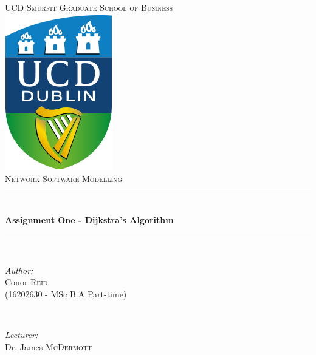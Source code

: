 \documentclass[paper=a4, fontsize=11pt]{scrartcl} %
\begin{document}
\begin{titlepage}

\newcommand{\HRule}{\rule{\linewidth}{0.5mm}} %

\center %


\textsc{\LARGE UCD Smurfit Graduate School of Business}\\[1.5cm] %
\includegraphics[scale = 0.6]{images/logo.png} \\ [1cm]
\textsc{\Large Network Software Modelling}\\[0.5cm] %


\HRule \\[0.4cm]
{ \LARGE \bfseries Assignment One - Dijkstra's Algorithm}\\[0.4cm] %
\HRule \\[1.5cm]


\begin{minipage}{0.4\textwidth}
\begin{flushleft} \large
\emph{Author:}\\
\small{Conor \textsc{Reid}\\ (16202630 - MSc B.A Part-time)} %
\end{flushleft}
\end{minipage}
~
\begin{minipage}{0.4\textwidth}
\begin{flushright} \large
\emph{Lecturer:} \\
Dr. James \textsc{McDermott} %
\end{flushright}
\end{minipage}\\[4cm]


\end{titlepage}
\end{document}
